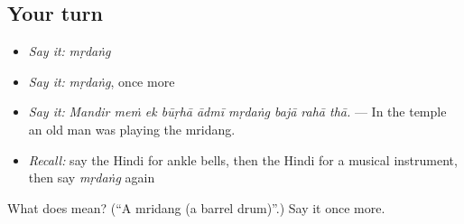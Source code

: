 \subsection*{Your turn}
\begin{itemize}
\raggedright
  \item \emph{Say it:} \emph{mṛdaṅg}
  \item \emph{Say it:} \emph{mṛdaṅg}, once more
  \item \emph{Say it:} \emph{Mandir meṁ ek būṛhā ādmī mṛdaṅg bajā rahā thā.} — In the temple an old man was playing the mridang.
  \item \emph{Recall:} say the Hindi for ankle bells, then the Hindi for a musical instrument, then say \emph{mṛdaṅg} again
\end{itemize}

\begin{tcolorbox}[breakable,colback=teal!4,colframe=teal!35!black,title={Before you move on}]
What does  mean? (\textquotedblleft{}A mridang (a barrel drum)\textquotedblright{}.) Say it once more.
\end{tcolorbox}
